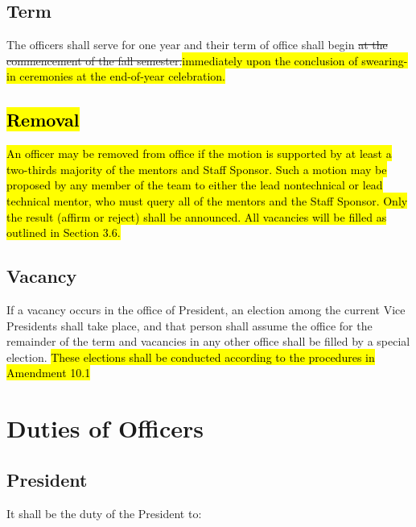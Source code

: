 \documentclass[12pt, a4paper]{article}
\begin{document}
\subsection{Term}
The officers shall serve for one year and their term of office shall begin \st{at the commencement of the fall semester.}\hl{immediately upon the conclusion of swearing-in ceremonies at the end-of-year celebration.}
\subsection{\hl{Removal}}
\hl{An officer may be removed from office if the motion is supported by at least a two-thirds majority of the mentors and Staff Sponsor. 
Such a motion may be proposed by any member of the team to either the lead nontechnical or lead technical mentor, who must query all of the mentors and the Staff Sponsor. 
Only the result (affirm or reject) shall be announced. All vacancies will be filled as outlined in Section 3.6.}
\subsection{Vacancy}
If a vacancy occurs in the office of President, an election among the current Vice Presidents shall take place, and that person shall assume the office for the remainder of the term and vacancies in any other office shall be filled by a special election. 
\hl{These elections shall be conducted according to the procedures in Amendment 10.1}

\section{Duties of Officers}
\subsection{President}
It shall be the duty of the President to:
\end{document}
